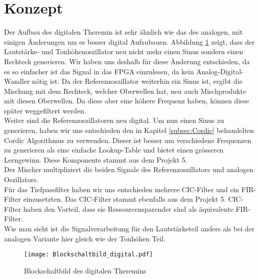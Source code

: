 \clearpage
\section{Konzept}\label{sec:Konzept}
Der Aufbau des digitalen Theremin ist sehr ähnlich wie das des analogen, mit einigen Änderungen um es besser digital Aufzubauen. Abbildung \ref{img:Blockschaltbild_digital} zeigt, dass der Lautstärke- und Tonhöhenoszillator neu nicht mehr einen Sinus sondern einen Rechteck generieren. Wir haben uns deshalb für diese Änderung entschieden, da es so einfacher ist das Signal in das FPGA einzulesen, da kein Analog-Digital-Wandler nötig ist. Da der Referenzoszillator weiterhin ein Sinus ist, ergibt die Mischung mit dem Rechteck, welcher Oberwellen hat, neu auch Mischprodukte mit diesen Oberwellen. Da diese aber eine höhere Frequenz haben, können diese später weggefiltert werden.\\
Weiter sind die Referenzoszillatoren neu digital. Um nun einen Sinus zu generieren, haben wir uns entschieden den in Kapitel \ref{subsec:Cordic} behandelten Cordic Algorithmus zu verwenden. Dieser ist besser um verschiedene Frequenzen zu generieren als eine einfache Lookup-Table und bietet einen grösseren Lerngewinn. Diese Komponente stammt aus dem Projekt 5. \\
Der Mischer multipliziert die beiden Signale des Referenzoszillators und analogen Oszillators.\\
Für das Tiefpassfilter haben wir uns entschieden mehrere CIC-Filter und ein FIR-Filter einzusetzten. Das CIC-Filter stammt ebenfalls aus dem Projekt 5. CIC-Filter haben den Vorteil, dass sie Ressourcensparender sind als äquivalente FIR-Filter.\\
Wie man sieht ist die Signalverarbeitung für den Lautstärketeil anders als bei der analogen Variante hier gleich wie der Tonhöhen Teil.

\begin{figure}[h]
	\centering
	\texttt{[image: Blockschaltbild\_digital.pdf]}
	\caption{Blockschaltbild des digitalen Theremins}
	\label{img:Blockschaltbild_digital}
\end{figure}